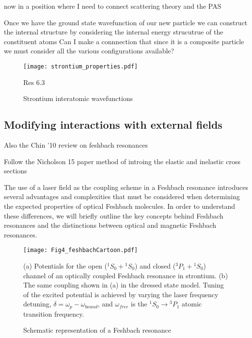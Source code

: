 now in a position where I need to connect scattering theory and the PAS


Once we have the ground state wavefunction of our new particle we can construct the internal structure by considering the internal energy strucutrue of the constituent atoms
	Can I make a connnection that since it is a composite particle we must consider all the various configurations available?
	
\begin{figure} \label{fig:ch3_sr_scat_wf}
	\centerline{
	\texttt{[image: strontium\_properties.pdf]}}
	\caption{Strontium interatomic wavefunctions}{Res 6.3}
\end{figure} 

\subsection{Modifying interactions with external fields} \label{ssec:mod_int}

Also the Chin '10 review on feshbach resonances

Follow the Nicholson 15 paper method of introing the elastic and inelastic cross sections

The use of a laser field as the coupling scheme in a Feshbach resonance introduces several advantages and complexities that must be considered when determining the expected properties of optical Feshbach molecules. In order to understand these differences, we will briefly outline the key concepts behind Feshbach resonances and the distinctions between optical and magnetic Feshbach resonances.


\begin{figure} \label{fig:ch3_FeshbachCartoon}
	\centerline{
	\texttt{[image: Fig4\_feshbachCartoon.pdf]}}
	\caption{Schematic representation of a Feshbach resonance}{(a) Potentials for the open ($^1S_0\!+\!^1S_0$) and closed ($^3P_1\!+\!^1S_0$) channel of an optically coupled Feshbach resonance in strontium. (b) The same coupling shown in (a) in the dressed state model. Tuning of the excited potential is achieved by varying the laser frequency detuning, $\delta = \omega_p - \omega_{bound}$, and $\omega_{free}$ is the $^1S_0\!\rightarrow\!^3P_1$ atomic transition frequency.}
\end{figure} 
	

